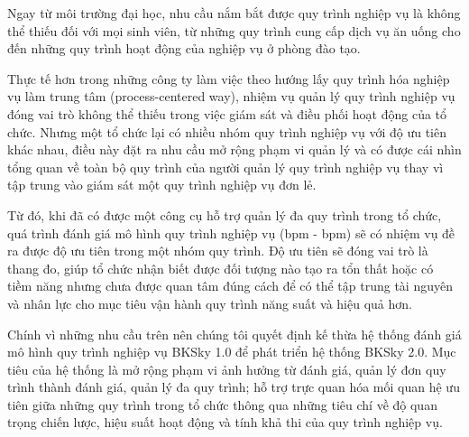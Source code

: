 Ngay từ môi trường đại học, nhu cầu nắm bắt được quy trình nghiệp vụ là không
thể thiếu đối với mọi sinh viên, từ những quy trình cung cấp dịch vụ ăn uống
cho đến những quy trình hoạt động của nghiệp vụ ở phòng đào tạo.

Thực tế hơn trong những công ty làm việc theo hướng lấy quy trình hóa nghiệp vụ
làm trung tâm (process-centered way), nhiệm vụ quản lý quy trình nghiệp vụ đóng
vai trò không thể thiếu trong việc giám sát và điều phối hoạt động của tổ chức.
Nhưng một tổ chức lại có nhiều nhóm quy trình nghiệp vụ với độ ưu tiên khác
nhau, điều này đặt ra nhu cầu mở rộng phạm vi quản lý và có được cái nhìn tổng
quan về toàn bộ quy trình của người quản lý quy trình nghiệp vụ thay vì tập
trung vào giám sát một quy trình nghiệp vụ đơn lẻ.

Từ đó, khi đã có được một công cụ hỗ trợ quản lý đa quy trình trong tổ chức,
quá trình đánh giá mô hình quy trình nghiệp vụ (\acrshort*{bpm} - \acrlong*{bpm})
sẽ có nhiệm vụ đề ra được độ ưu tiên trong một nhóm quy trình. Độ ưu tiên sẽ
đóng vai trò là thang đo, giúp tổ chức nhận biết được đối tượng nào tạo ra tổn
thất hoặc có tiềm năng nhưng chưa được quan tâm đúng cách để có thể tập trung
tài nguyên và nhân lực cho mục tiêu vận hành quy trình năng suất và hiệu quả
hơn.

Chính vì những nhu cầu trên nên chúng tôi quyết định kế thừa hệ thống đánh giá
mô hình quy trình nghiệp vụ BKSky 1.0 để phát triển hệ thống BKSky 2.0. Mục
tiêu của hệ thống là mở rộng phạm vi ảnh hưởng từ đánh giá, quản lý đơn quy
trình thành đánh giá, quản lý đa quy trình; hỗ trợ trực quan hóa mối quan hệ ưu
tiên giữa những quy trình trong tổ chức thông qua những tiêu chí về độ quan
trọng chiến lược, hiệu suất hoạt động và tính khả thi của quy trình nghiệp vụ.
